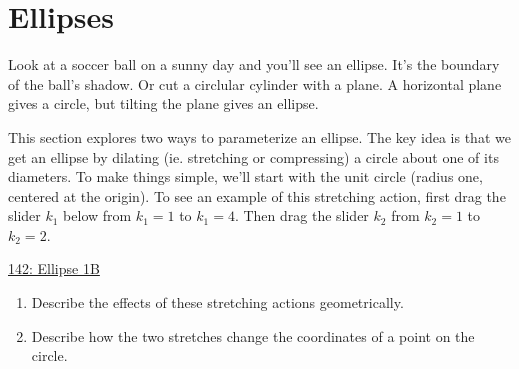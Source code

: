 \documentclass{ximera}
\begin{document}
\section{Ellipses}

Look at a soccer ball on a sunny day and you'll see an ellipse. It's the boundary of the ball's shadow. Or cut a circlular cylinder with a plane. A horizontal plane gives a circle, but tilting the plane gives an ellipse.

This section explores two ways to parameterize an ellipse. The key idea is that we get an ellipse by dilating (ie. stretching or compressing) a circle about one of its diameters. To make things simple, we'll start with the unit circle (radius one, centered at the origin). To see an example of this stretching action, first drag the slider $k_1$ below from $k_1=1$ to $k_1=4$. Then drag the slider $k_2$ from $k_2=1$ to $k_2=2$.

\begin{onlineOnly}
    \begin{center}
\end{center}
\end{onlineOnly}

\href{https://www.desmos.com/calculator/l2wiiamr0a}{142: Ellipse 1B}


\begin{question} \label{QLDkferedsf}
\begin{enumerate}
\item Describe the effects of these stretching actions geometrically.

\item Describe how the two stretches change the coordinates of a point on the circle.
\end{enumerate}
\end{question}
\end{document}
